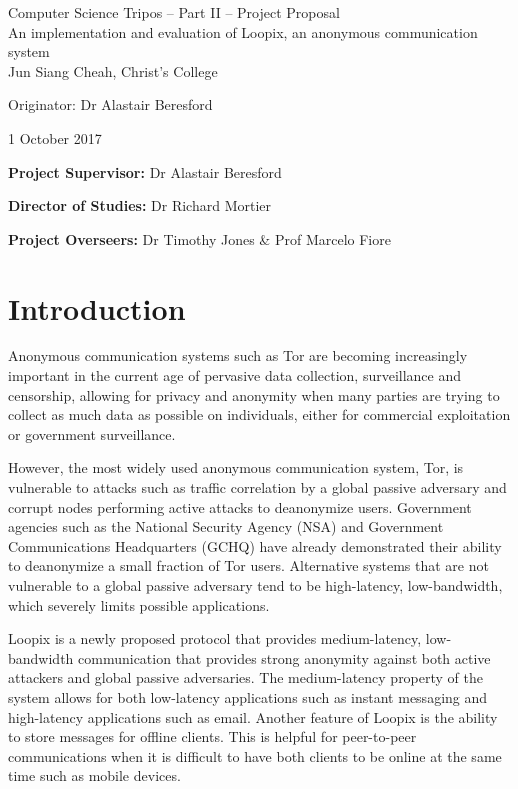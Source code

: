 \documentclass[12pt,a4paper,twoside]{article}
\begin{document}
	
	\begin{center}
		\Large
		Computer Science Tripos -- Part II -- Project Proposal\\[4mm]
		\LARGE
		An implementation and evaluation of Loopix, an anonymous communication system\\[4mm]
		
		\large
		Jun Siang Cheah, Christ's College
		
		Originator: Dr Alastair Beresford
		
		1 October 2017
	\end{center}
	
	\vspace{5mm}
	
	\textbf{Project Supervisor:} Dr Alastair Beresford
	
	\textbf{Director of Studies:} Dr Richard Mortier
	
	\textbf{Project Overseers:} Dr Timothy Jones \& Prof Marcelo Fiore 
	
	
	\section*{Introduction}
	
	Anonymous communication systems such as Tor are becoming increasingly important in the current age of pervasive data collection, surveillance and censorship, allowing for privacy and anonymity when many parties are trying to collect as much data as possible on individuals, either for commercial exploitation or government surveillance.
	
	However, the most widely used anonymous communication system, Tor, is vulnerable to attacks such as traffic correlation by a global passive adversary and corrupt nodes performing active attacks to deanonymize users. Government agencies such as the National Security Agency (NSA) and Government Communications Headquarters (GCHQ) have already demonstrated their ability to deanonymize a small fraction of Tor users.\cite{torstinks} Alternative systems that are not vulnerable to a global passive adversary tend to be high-latency, low-bandwidth, which severely limits possible applications.
	
	Loopix\cite{piotrowska2017loopix} is a newly proposed protocol that provides medium-latency, low-bandwidth communication that provides strong anonymity against both active attackers and global passive adversaries. The medium-latency property of the system allows for both low-latency applications such as instant messaging and high-latency applications such as email. Another feature of Loopix is the ability to store messages for offline clients. This is helpful for peer-to-peer communications when it is difficult to have both clients to be online at the same time such as mobile devices.
	
\end{document}
